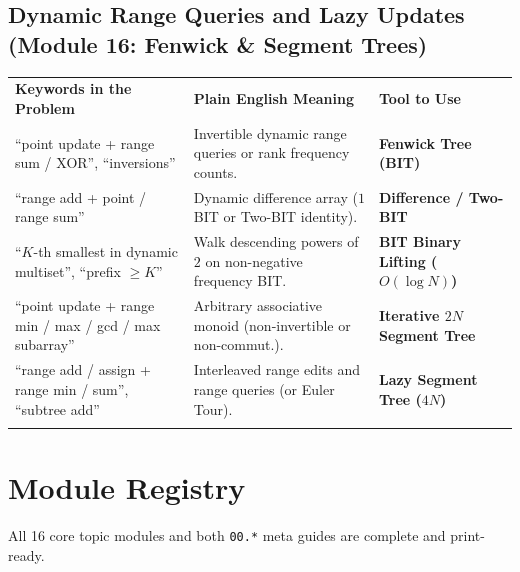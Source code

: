 \documentclass[11pt,a4paper]{article}
\begin{document}
\subsection{Dynamic Range Queries and Lazy Updates (Module 16: Fenwick \& Segment Trees)}
\begingroup\footnotesize{}
\begin{tabularx}{\textwidth}{>{\raggedright\arraybackslash}p{4.4cm} >{\raggedright\arraybackslash}X >{\raggedright\arraybackslash\bfseries}p{4.0cm}}
\arrayrulecolor{primaryblue}\toprule[1.1pt]
\rowcolor{primaryblue!10}
\textcolor{primaryblue}{\textbf{Keywords in the Problem}} & \textcolor{primaryblue}{\textbf{Plain English Meaning}} & \textcolor{primaryblue}{\textbf{Tool to Use}} \\
\arrayrulecolor{codeframe}\midrule[0.6pt]
``point update + range sum / XOR'', ``inversions'' & Invertible dynamic range queries or rank frequency counts. & Fenwick Tree (BIT) \\
``range add + point / range sum'' & Dynamic difference array ($1$ BIT or Two-BIT identity). & Difference / Two-BIT \\
``$K$-th smallest in dynamic multiset'', ``prefix $\ge K$'' & Walk descending powers of $2$ on non-negative frequency BIT. & BIT Binary Lifting ($O(\log N)$) \\
``point update + range min / max / gcd / max subarray'' & Arbitrary associative monoid (non-invertible or non-commut.). & Iterative $2N$ Segment Tree \\
``range add / assign + range min / sum'', ``subtree add'' & Interleaved range edits and range queries (or Euler Tour). & Lazy Segment Tree ($4N$) \\
\arrayrulecolor{primaryblue}\bottomrule[1.1pt]
\end{tabularx}\endgroup

\section{Module Registry}
\label{sec:registry}

All 16 core topic modules and both \texttt{00.*} meta guides are complete and print-ready.
\end{document}
